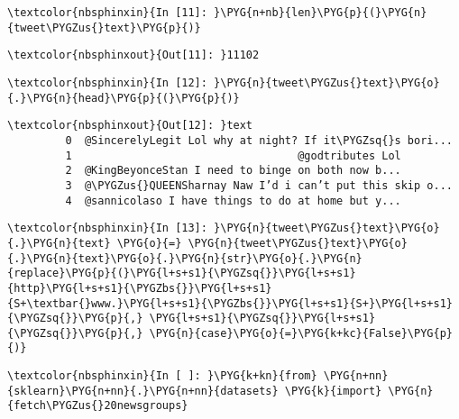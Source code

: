 \documentclass[letterpaper,10pt,english]{sphinxmanual}
\begin{document}
%
\begin{Verbatim}[commandchars=\\\{\}]
\textcolor{nbsphinxin}{In [11]: }\PYG{n+nb}{len}\PYG{p}{(}\PYG{n}{tweet\PYGZus{}text}\PYG{p}{)}
\end{Verbatim}

%
\begin{Verbatim}[commandchars=\\\{\}]
\textcolor{nbsphinxout}{Out[11]: }11102
\end{Verbatim}

%
\begin{Verbatim}[commandchars=\\\{\}]
\textcolor{nbsphinxin}{In [12]: }\PYG{n}{tweet\PYGZus{}text}\PYG{o}{.}\PYG{n}{head}\PYG{p}{(}\PYG{p}{)}
\end{Verbatim}

%
\begin{Verbatim}[commandchars=\\\{\}]
\textcolor{nbsphinxout}{Out[12]: }text
         0  @SincerelyLegit Lol why at night? If it\PYGZsq{}s bori...
         1                                   @godtributes Lol
         2  @KingBeyonceStan I need to binge on both now b...
         3  @\PYGZus{}QUEENSharnay Naw I’d i can’t put this skip o...
         4  @sannicolaso I have things to do at home but y...
\end{Verbatim}

%
\begin{Verbatim}[commandchars=\\\{\}]
\textcolor{nbsphinxin}{In [13]: }\PYG{n}{tweet\PYGZus{}text}\PYG{o}{.}\PYG{n}{text} \PYG{o}{=} \PYG{n}{tweet\PYGZus{}text}\PYG{o}{.}\PYG{n}{text}\PYG{o}{.}\PYG{n}{str}\PYG{o}{.}\PYG{n}{replace}\PYG{p}{(}\PYG{l+s+s1}{\PYGZsq{}}\PYG{l+s+s1}{http}\PYG{l+s+s1}{\PYGZbs{}}\PYG{l+s+s1}{S+\textbar{}www.}\PYG{l+s+s1}{\PYGZbs{}}\PYG{l+s+s1}{S+}\PYG{l+s+s1}{\PYGZsq{}}\PYG{p}{,} \PYG{l+s+s1}{\PYGZsq{}}\PYG{l+s+s1}{\PYGZsq{}}\PYG{p}{,} \PYG{n}{case}\PYG{o}{=}\PYG{k+kc}{False}\PYG{p}{)}
\end{Verbatim}

%
\begin{Verbatim}[commandchars=\\\{\}]
\textcolor{nbsphinxin}{In [ ]: }\PYG{k+kn}{from} \PYG{n+nn}{sklearn}\PYG{n+nn}{.}\PYG{n+nn}{datasets} \PYG{k}{import} \PYG{n}{fetch\PYGZus{}20newsgroups}
\end{Verbatim}
\end{document}
